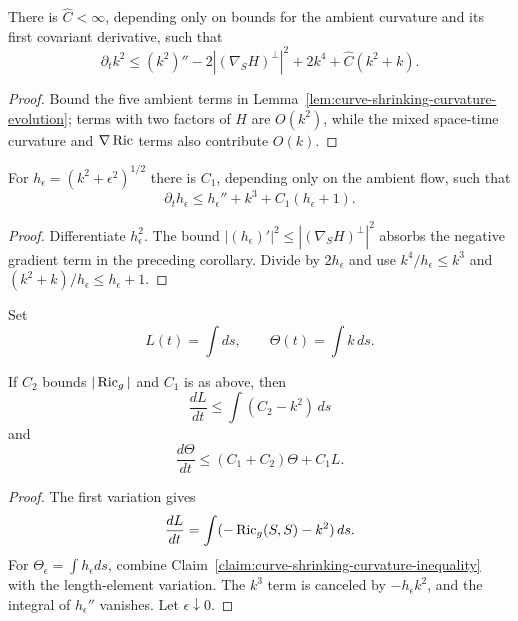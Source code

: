 \begin{corollary}
\label{cor:curve-shrinking-curvature-inequality-bound}
\label{*4'}


There is $\widehat C<\infty$, depending only on bounds for the ambient
curvature and its first covariant derivative, such that
\[
\partial_tk^2\le(k^2)''-2|(\nabla_SH)^\perp|^2+2k^4
+\widehat C(k^2+k).
\]
\end{corollary}
\begin{proof}
\sketch Bound the five ambient terms in
Lemma~\ref{lem:curve-shrinking-curvature-evolution}; terms with two factors of
$H$ are $O(k^2)$, while the mixed space-time curvature and $\nabla\operatorname{Ric}$ terms
also contribute $O(k)$.
\end{proof}

\begin{claim}
\label{claim:curve-shrinking-curvature-inequality}
\label{3rdcurvshr}


For $h_\epsilon=(k^2+\epsilon^2)^{1/2}$ there is $C_1$, depending only on the
ambient flow, such that
\[
\partial_th_\epsilon\le h_\epsilon''+k^3+C_1(h_\epsilon+1).
\]
\end{claim}
\begin{proof}
\sketch Differentiate $h_\epsilon^2$. The bound
$|(h_\epsilon)'|^2\le|(\nabla_SH)^\perp|^2$ absorbs the negative gradient term
in the preceding corollary. Divide by $2h_\epsilon$ and use
$k^4/h_\epsilon\le k^3$ and $(k^2+k)/h_\epsilon\le h_\epsilon+1$.
\end{proof}

Set
\[
L(t)=\int ds,
\qquad
\Theta(t)=\int k\,ds.
\]

\begin{lemma}
\label{lem:curve-shrinking-length-curvature-growth}
\label{1835}


If $C_2$ bounds $|\operatorname{Ric}_g|$ and $C_1$ is as above, then
\begin{equation}\label{Lformula}
\frac{dL}{dt}\le\int(C_2-k^2)\,ds
\end{equation}
and
\[
\frac{d\Theta}{dt}\le(C_1+C_2)\Theta+C_1L.
\]
\end{lemma}
\begin{proof}
\sketch The first variation gives
\begin{equation}\label{dLdteqn}
\frac{dL}{dt}=\int(-\operatorname{Ric}_g(S,S)-k^2)\,ds.
\end{equation}
For $\Theta_\epsilon=\int h_\epsilon ds$, combine
Claim~\ref{claim:curve-shrinking-curvature-inequality} with the length-element
variation. The $k^3$ term is canceled by $-h_\epsilon k^2$, and the integral
of $h_\epsilon''$ vanishes. Let $\epsilon\downarrow0$.
\end{proof}

